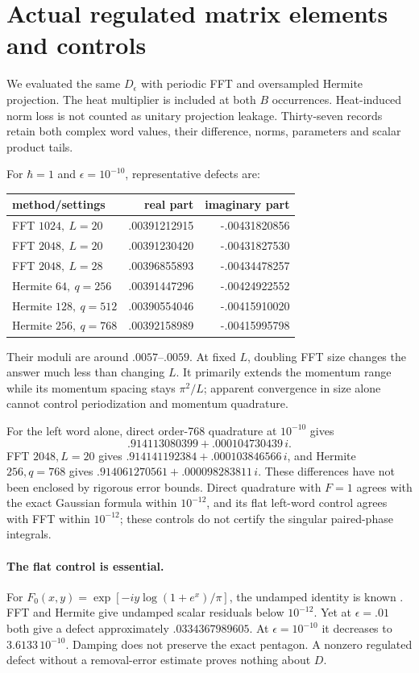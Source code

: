 \documentclass[11pt,a4paper]{article}
\newcommand{\eps}{\epsilon}
\begin{document}
\newpage
\section{Actual regulated matrix elements and controls}
We evaluated the same $D_\eps$ with periodic FFT and oversampled
Hermite projection. The heat multiplier is included at both $B$
occurrences. Heat-induced norm loss is not counted as unitary
projection leakage. Thirty-seven records retain both complex word
values, their difference, norms, parameters and scalar product tails.

For $\hbar=1$ and $\eps=10^{-10}$, representative defects are:
\begin{center}
\begin{tabular}{lrr}
\toprule
method/settings & real part & imaginary part\\
\midrule
FFT $1024,\ L=20$ & .00391212915 & -.00431820856\\
FFT $2048,\ L=20$ & .00391230420 & -.00431827530\\
FFT $2048,\ L=28$ & .00396855893 & -.00434478257\\
Hermite $64,\ q=256$ & .00391447296 & -.00424922552\\
Hermite $128,\ q=512$ & .00390554046 & -.00415910020\\
Hermite $256,\ q=768$ & .00392158989 & -.00415995798\\
\bottomrule
\end{tabular}
\end{center}
Their moduli are around $.0057$--$.0059$. At fixed $L$, doubling
FFT size changes the answer much less than changing $L$.
It primarily extends the momentum range while its momentum spacing
stays $\pi^2/L$; apparent convergence in size alone cannot control
periodization and momentum quadrature.

For the left word alone, direct order-768 quadrature at $10^{-10}$
gives
\[
 .914113080399+ .000104730439\,i.
\]
FFT $2048,L=20$ gives $.914141192384+.000103846566\,i$, and
Hermite $256,q=768$ gives $.914061270561+.000098283811\,i$.
These differences have not been enclosed by rigorous error bounds.
Direct quadrature with $F=1$ agrees with the exact Gaussian formula
within $10^{-12}$, and its flat left-word control agrees with FFT
within $10^{-12}$; these controls do not certify the singular
paired-phase integrals.

\paragraph{The flat control is essential.}
For $F_0(x,y)=\exp[-iy\log(1+e^x)/\pi]$, the undamped identity is
known \cite{ks}. FFT and Hermite give undamped scalar residuals
below $10^{-12}$. Yet at $\eps=.01$ both give a defect
approximately $.0334367989605$.
At $\eps=10^{-10}$ it decreases to $3.6133\,10^{-10}$.
Damping does not preserve the exact pentagon. A nonzero regulated
defect without a removal-error estimate proves nothing about $D$.
\end{document}
